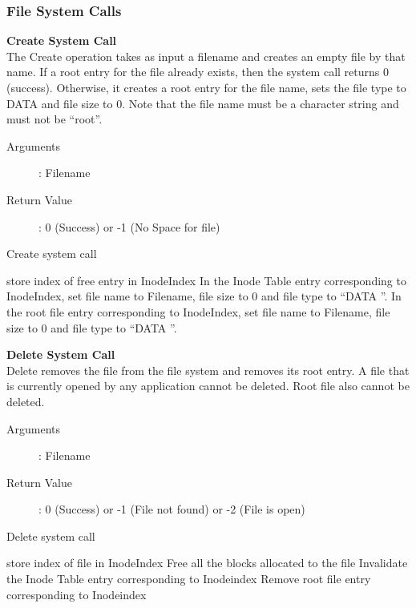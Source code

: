 \documentclass[10pt]{article}
\begin{document}
\subsubsection{File System Calls}
\textbf{Create System Call}
\vspace{3mm}\\
The Create operation takes as input a filename and creates an empty file by that name. If a root entry for the file already exists, then the system call returns 0 (success). Otherwise, it creates a root entry for the file name, sets the file type to DATA and file size to 0. Note that the file name must be a character string and must not be “root”. 
\begin{description}
\item[Arguments]: Filename
\item[Return Value]: 0 (Success) or -1 (No Space for file)
\end{description}
\vspace{3mm}
\begin{algorithm}
\caption{Create system call}
\begin{algorithmic}
\ENDIF    
{}
\ELSE
    \STATE store index of free entry in InodeIndex
\ENDIF   
\STATE In the Inode Table entry corresponding to InodeIndex, set file name to Filename, file size to 0 and file type to “DATA ”.
\STATE In the root file entry corresponding to InodeIndex, set file name to Filename, file size to 0 and file type to “DATA ”.
\end{algorithmic}
\end{algorithm}
\textbf{Delete System Call}
\vspace{3mm}\\
Delete removes the file from the file system and removes its root entry. A file that is currently opened by any application cannot be deleted. Root file also cannot be deleted.
\begin{description}
	\item[Arguments]: Filename
	\item[Return Value]: 0 (Success) or -1 (File not found) or -2 (File is open)
\end{description} 
\begin{algorithm}
\caption{Delete system call}
\begin{algorithmic}
\ELSE
    \STATE store index of file in InodeIndex
\ENDIF    
{}
\ENDIF
\STATE Free all the blocks allocated to the file
\STATE Invalidate the Inode Table entry corresponding to Inodeindex
\STATE Remove root file entry corresponding to Inodeindex
\end{algorithmic}
\end{algorithm}
\end{document}
